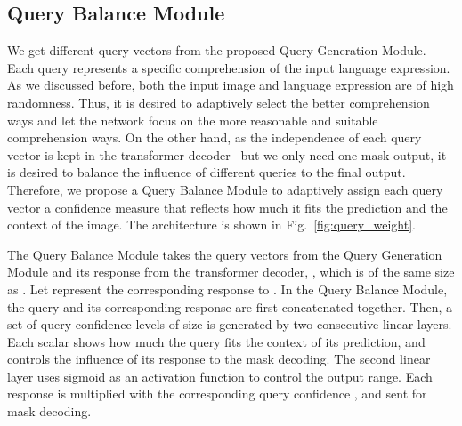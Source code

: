 \documentclass[10pt,twocolumn,letterpaper]{article}
\begin{document}
\begin{table*}[t]
   \centering
   \small
   \caption{Comparison of our query generation method with other related methods. ``'': use the language features of all words as queries. ``Learnt'': queries are parameters learnt in training while fixed in testing, similar with~\cite{carion2020end}.}
   \vspace{-0.1in}
   \label{tab:exp_qgm}\end{table*}

\subsection{Query Balance Module}
We get  different query vectors from the proposed Query Generation Module. Each query represents a specific comprehension of the input language expression. As we discussed before, both the input image and language expression are of high randomness. Thus, it is desired to adaptively select the better comprehension ways and let the network focus on the more reasonable and suitable comprehension ways.
On the other hand, as the independence of each query vector is kept in the transformer decoder~\cite{carion2020end} but we only need one mask output, it is desired to balance the influence of different queries to the final output. Therefore, we propose a Query Balance Module to adaptively assign each query vector a confidence measure that reflects how much it fits the prediction and the context of the image. The architecture is shown in Fig.~\ref{fig:query_weight}.

The Query Balance Module takes the query vectors  from the Query Generation Module and its response from the transformer decoder, , which is of the same size as . Let  represent the corresponding response to . In the Query Balance Module, the query and its corresponding response are first concatenated together. Then, a set of query confidence levels  of size  is generated by two consecutive linear layers. Each scalar  shows how much the query  fits the context of its prediction, and controls the influence of its response  to the mask decoding. The second linear layer uses sigmoid as an activation function to control the output range. Each response  is multiplied with the corresponding query confidence , and sent for mask decoding.
\end{document}
